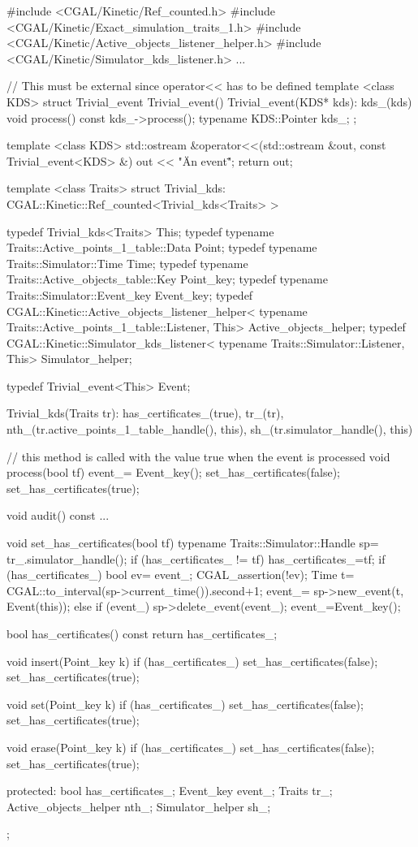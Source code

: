 \begin{ccExampleCode}
#include <CGAL/Kinetic/Ref_counted.h>
#include <CGAL/Kinetic/Exact_simulation_traits_1.h>
#include <CGAL/Kinetic/Active_objects_listener_helper.h>
#include <CGAL/Kinetic/Simulator_kds_listener.h>
...

// This must be external since operator<< has to be defined
template <class KDS>
struct Trivial_event
{
  Trivial_event(){}
  Trivial_event(KDS* kds): kds_(kds) {
  }
  void process() const
  {
    kds_->process();
  }
  typename KDS::Pointer kds_;
};

template <class KDS>
std::ostream &operator<<(std::ostream &out,
			 const Trivial_event<KDS> &) {
  out << "\"An event\"";
  return out;
}


template <class Traits>
struct Trivial_kds: CGAL::Kinetic::Ref_counted<Trivial_kds<Traits> >
{
  typedef Trivial_kds<Traits> This;
  typedef typename Traits::Active_points_1_table::Data Point;
  typedef typename Traits::Simulator::Time Time;
  typedef typename Traits::Active_objects_table::Key Point_key;
  typedef typename Traits::Simulator::Event_key Event_key;
  typedef CGAL::Kinetic::Active_objects_listener_helper<
    typename Traits::Active_points_1_table::Listener, This> Active_objects_helper;
  typedef CGAL::Kinetic::Simulator_kds_listener<
    typename Traits::Simulator::Listener, This> Simulator_helper;

  typedef Trivial_event<This> Event;

  Trivial_kds(Traits tr): has_certificates_(true),
			  tr_(tr),
			  nth_(tr.active_points_1_table_handle(), this),
			  sh_(tr.simulator_handle(), this){}

  // this method is called with the value true when the event is processed
  void process(bool tf) {
     event_= Event_key();
     set_has_certificates(false);
     set_has_certificates(true);
  }

  void audit() const
  {
     ...
  }

  void set_has_certificates(bool tf) {
    typename Traits::Simulator::Handle sp= tr_.simulator_handle();
    if (has_certificates_ != tf) {
      has_certificates_=tf;
      if (has_certificates_) {
	bool ev= event_;
	CGAL_assertion(!ev);
	Time t= CGAL::to_interval(sp->current_time()).second+1;
	event_= sp->new_event(t, Event(this));
      } else if (event_) {
	sp->delete_event(event_);
	event_=Event_key();
      }
    }
  }

  bool has_certificates() const {
    return has_certificates_;
  }

  void insert(Point_key k) {
    if (has_certificates_) {
      set_has_certificates(false);
      set_has_certificates(true);
    }
  }

  void set(Point_key k) {
    if (has_certificates_) {
      set_has_certificates(false);
      set_has_certificates(true);
    }
  }

  void erase(Point_key k) {
    if (has_certificates_) {
      set_has_certificates(false);
      set_has_certificates(true);
    }
  }

protected:
  bool has_certificates_;
  Event_key event_;
  Traits tr_;
  Active_objects_helper nth_;
  Simulator_helper sh_;
};

\end{ccExampleCode}
